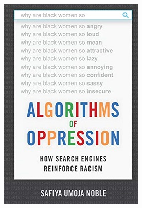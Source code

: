 \begin{frame}
  \begin{figure}
    \includegraphics[height=0.8\textheight]{fig/Algorithms-of-Oppression.jpg}
  \end{figure}
\end{frame}

